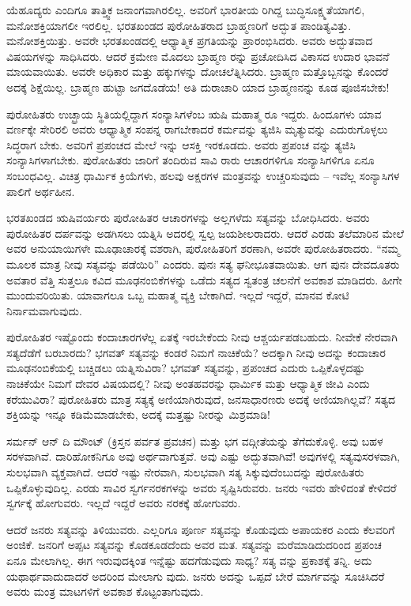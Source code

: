 ಯೆಹೂದ್ಯರು ಎಂದಿಗೂ ತಾತ್ತ್ವಿಕ ಜನಾಂಗವಾಗಿರಲಿಲ್ಲ. ಅವರಿಗೆ ಭಾರತೀಯ ರಿಗಿದ್ದ ಬುದ್ಧಿಸೂಕ್ಷ್ಮತೆಯಾಗಲಿ, ಮನೋಶಕ್ತಿಯಾಗಲೀ ಇರಲಿಲ್ಲ. ಭರತಖಂಡದ ಪುರೋಹಿತರಾದ ಬ್ರಾಹ್ಮಣರಿಗೆ ಅದ್ಭುತ ಪಾಂಡಿತ್ಯವಿತ್ತು. ಮನೋಶಕ್ತಿಯಿತ್ತು. ಅವರೇ ಭರತಖಂಡದಲ್ಲಿ ಆಧ್ಯಾತ್ಮಿಕ ಪ್ರಗತಿಯನ್ನು ಪ್ರಾರಂಭಿಸಿದರು. ಅವರು ಅದ್ಭುತವಾದ ವಿಷಯಗಳನ್ನು ಸಾಧಿಸಿದರು. ಆದರೆ ಕ್ರಮೇಣ ಮೊದಲು ಬ್ರಾಹ್ಮಣ ರನ್ನು ಪ್ರಚೋದಿಸಿದ ವಿಕಾಸದ ಉದಾರ ಭಾವನೆ ಮಾಯವಾಯಿತು. ಅವರೇ ಅಧಿಕಾರ ಮತ್ತು ಹಕ್ಕುಗಳನ್ನು ದೋಚಲೆತ್ನಿಸಿದರು. ಬ್ರಾಹ್ಮಣ ಮತ್ತೊಬ್ಬನನ್ನು ಕೊಂದರೆ ಅದಕ್ಕೆ ಶಿಕ್ಷೆಯಿಲ್ಲ. ಬ್ರಾಹ್ಮಣ ಹುಟ್ಟಾ ಜಗದೊಡೆಯ! ಅತಿ ದುರಾಚಾರಿ ಯಾದ ಬ್ರಾಹ್ಮಣನನ್ನು ಕೂಡ ಪೂಜಿಸಬೇಕು!

ಪುರೋಹಿತರು ಉಚ್ಛ್ರಾಯ ಸ್ಥಿತಿಯಲ್ಲಿದ್ದಾಗ ಸಂನ್ಯಾಸಿಗಳೆಂಬ ಋಷಿ ಮಹಾತ್ಮ ರೂ ಇದ್ದರು. ಹಿಂದೂಗಳು ಯಾವ ವರ್ಣಕ್ಕೇ ಸೇರಿರಲಿ ಅವರು ಆಧ್ಯಾತ್ಮಿಕ ಸಂಪನ್ನ ರಾಗಬೇಕಾದರೆ ಕರ್ಮವನ್ನು ತ್ಯಜಿಸಿ ಮೃತ್ಯುವನ್ನು ಎದುರುಗೊಳ್ಳಲು ಸಿದ್ಧರಾಗ ಬೇಕು. ಅವರಿಗೆ ಪ್ರಪಂಚದ ಮೇಲೆ ಇನ್ನು ಆಸಕ್ತಿ ಇರಕೂಡದು. ಅವರು ಪ್ರಪಂಚ ವನ್ನು ತ್ಯಜಿಸಿ ಸಂನ್ಯಾಸಿಗಳಾಗಬೇಕು. ಪುರೋಹಿತರು ಜಾರಿಗೆ ತಂದಿರುವ ಸಾವಿ ರಾರು ಆಚಾರಗಳಿಗೂ ಸಂನ್ಯಾಸಿಗಳಿಗೂ ಏನೂ ಸಂಬಂಧವಿಲ್ಲ. ವಿಚಿತ್ರ ಧಾರ್ಮಿಕ ಕ್ರಿಯೆಗಳು, ಹಲವು ಅಕ್ಷರಗಳ ಮಂತ್ರವನ್ನು ಉಚ್ಚರಿಸುವುದು – ಇವೆಲ್ಲ ಸಂನ್ಯಾಸಿಗಳ ಪಾಲಿಗೆ ಅರ್ಥಹೀನ.

ಭರತಖಂಡದ ಋಷಿವರ್ಯರು ಪುರೋಹಿತರ ಆಚಾರಗಳನ್ನು ಅಲ್ಲಗಳೆದು ಸತ್ಯವನ್ನು ಬೋಧಿಸಿದರು. ಅವರು ಪುರೋಹಿತರ ದರ್ಪವನ್ನು ಅಡಗಿಸಲು ಯತ್ನಿಸಿ ಅದರಲ್ಲಿ ಸ್ವಲ್ಪ ಜಯಶೀಲರಾದರು. ಆದರೆ ಎರಡು ತಲೆಮಾರಿನ ಮೇಲೆ ಅವರ ಅನುಯಾಯಿಗಳೇ ಮೂಢಾಚಾರಕ್ಕೆ ವಶರಾಗಿ, ಪುರೋಹಿತರಿಗೆ ಶರಣಾಗಿ, ಅವರೇ ಪುರೋಹಿತರಾದರು. “ನಮ್ಮ ಮೂಲಕ ಮಾತ್ರ ನೀವು ಸತ್ಯವನ್ನು ಪಡೆಯಿರಿ” ಎಂದರು. ಪುನಃ ಸತ್ಯ ಘನೀಭೂತವಾಯಿತು. ಆಗ ಪುನಃ ದೇವದೂತರು ಅವತಾರ ವೆತ್ತಿ ಸುತ್ತಲೂ ಕವಿದ ಮೂಢನಂಬಿಕೆಗಳನ್ನು ಒಡೆದು ಸತ್ಯದ ಸ್ವತಂತ್ರ ಚಲನೆಗೆ ಅವಕಾಶ ಮಾಡಿದರು. ಹೀಗೇ ಮುಂದುವರಿಯಿತು. ಯಾವಾಗಲೂ ಒಬ್ಬ ಮಹಾತ್ಮ ವ್ಯಕ್ತಿ ಬೇಕಾಗಿದೆ. ಇಲ್ಲದೆ ಇದ್ದರೆ, ಮಾನವ ಕೋಟಿ ನಿರ್ನಾಮವಾಗುವುದು.

ಪುರೋಹಿತರ ಇಷ್ಟೊಂದು ಕಂದಾಚಾರಗಳೆಲ್ಲ ಏತಕ್ಕೆ ಇರಬೇಕೆಂದು ನೀವು ಆಶ್ಚರ್ಯಪಡಬಹುದು. ನೀವೇಕೆ ನೇರವಾಗಿ ಸತ್ಯದೆಡೆಗೆ ಬರಬಾರದು? ಭಗವತ್​ ಸತ್ಯವನ್ನು ಕಂಡರೆ ನಿಮಗೆ ನಾಚಿಕೆಯೆ? ಅದಕ್ಕಾಗಿ ನೀವು ಅದನ್ನು ಕಂದಾಚಾರ ಮೂಢನಂಬಿಕೆಯಲ್ಲಿ ಬಚ್ಚಿಡಲು ಯತ್ನಿಸುವಿರಾ? ಭಗವತ್​ ಸತ್ಯವನ್ನು, ಪ್ರಪಂಚದ ಎದುರು ಒಪ್ಪಿಕೊಳ್ಳದಷ್ಟು ನಾಚಿಕೆಯೇ ನಿಮಗೆ ದೇವರ ವಿಷಯದಲ್ಲಿ? ನೀವು ಅಂತಹವರನ್ನು ಧಾರ್ಮಿಕ ಮತ್ತು ಆಧ್ಯಾತ್ಮಿಕ ಜೀವಿ ಎಂದು ಕರೆಯುವಿರಾ? ಪುರೋಹಿತರು ಮಾತ್ರ ಸತ್ಯಕ್ಕೆ ಅಣಿಯಾಗಿರುವುದೆ, ಜನಸಾಧಾರಣರು ಅದಕ್ಕೆ ಅಣಿಯಾಗಿಲ್ಲವೆ? ಸತ್ಯದ ಶಕ್ತಿಯನ್ನು ಇನ್ನೂ ಕಡಿಮೆಮಾಡಬೇಕು, ಅದಕ್ಕೆ ಮತ್ತಷ್ಟು ನೀರನ್ನು ಮಿಶ್ರಮಾಡಿ!

ಸರ್ಮನ್​ ಆನ್​ ದಿ ಮೌಂಟ್​ (ಕ್ರಿಸ್ತನ ಪರ್ವತ ಪ್ರವಚನ) ಮತ್ತು ಭಗ ವದ್ಗೀತೆಯನ್ನು ತೆಗೆದುಕೊಳ್ಳಿ. ಅವು ಬಹಳ ಸರಳವಾಗಿವೆ. ದಾರಿಹೋಕನಿಗೂ ಅವು ಅರ್ಥವಾಗುತ್ತವೆ. ಅವು ಎಷ್ಟು ಅದ್ಭುತವಾಗಿವೆ! ಅವುಗಳಲ್ಲಿ ಸತ್ಯವುಸರಳವಾಗಿ, ಸುಲಭವಾಗಿ ವ್ಯಕ್ತವಾಗಿದೆ. ಆದರೆ ಇಷ್ಟು ನೇರವಾಗಿ, ಸುಲಭವಾಗಿ ಸತ್ಯ ಸಿಕ್ಕುವುದೆಂಬುದನ್ನು ಪುರೋಹಿತರು ಒಪ್ಪಿಕೊಳ್ಳುವುದಿಲ್ಲ. ಎರಡು ಸಾವಿರ ಸ್ವರ್ಗನರಕಗಳನ್ನು ಅವರು ಸೃಷ್ಟಿಸಿರುವರು. ಜನರು ಇವರು ಹೇಳಿದಂತೆ ಕೇಳಿದರೆ ಸ್ವರ್ಗಕ್ಕೆ ಹೋಗುವರು. ಇಲ್ಲದೆ ಇದ್ದರೆ ಅವರು ನರಕಕ್ಕೆ ಹೋಗುವರು.

ಆದರೆ ಜನರು ಸತ್ಯವನ್ನು ತಿಳಿಯುವರು. ಎಲ್ಲರಿಗೂ ಪೂರ್ಣ ಸತ್ಯವನ್ನು ಕೊಡುವುದು ಅಪಾಯಕರ ಎಂದು ಕೆಲವರಿಗೆ ಅಂಜಿಕೆ. ಜನರಿಗೆ ಅಪ್ಪಟ ಸತ್ಯವನ್ನು ಕೊಡಕೂಡದೆಂದು ಅವರ ಮತ. ಸತ್ಯವನ್ನು ಮರೆಮಾಡಿದುದರಿಂದ ಪ್ರಪಂಚ ಏನೂ ಮೇಲಾಗಿಲ್ಲ. ಈಗ ಇರುವುದಕ್ಕಿಂತ ಇನ್ನೆಷ್ಟು ಹದಗೆಡುವುದು ಸಾಧ್ಯ? ಸತ್ಯ ವನ್ನು ಪ್ರಕಾಶಕ್ಕೆ ತನ್ನಿ. ಅದು ಯಥಾರ್ಥವಾದುದಾದರೆ ಅದರಿಂದ ಮೇಲಾಗು ವುದು. ಜನರು ಅದನ್ನು ಒಪ್ಪದೆ ಬೇರೆ ಮಾರ್ಗವನ್ನು ಸೂಚಿಸಿದರೆ ಅವರು ಮಂತ್ರ ಮಾಟಗಳಿಗೆ ಅವಕಾಶ ಕೊಟ್ಟಂತಾಗುವುದು.

